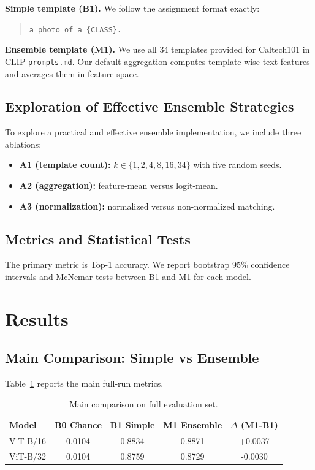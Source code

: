 \documentclass[11pt]{article}
\begin{document}
\textbf{Simple template (B1).}
We follow the assignment format exactly:
\begin{quote}
\texttt{a photo of a \{CLASS\}.}
\end{quote}

\textbf{Ensemble template (M1).}
We use all 34 templates provided for Caltech101 in CLIP \texttt{prompts.md}.
Our default aggregation computes template-wise text features and averages them in feature space.

\subsection{Exploration of Effective Ensemble Strategies}

To explore a practical and effective ensemble implementation, we include three ablations:
\begin{itemize}
  \item \textbf{A1 (template count):} $k \in \{1,2,4,8,16,34\}$ with five random seeds.
  \item \textbf{A2 (aggregation):} feature-mean versus logit-mean.
  \item \textbf{A3 (normalization):} normalized versus non-normalized matching.
\end{itemize}

\subsection{Metrics and Statistical Tests}

The primary metric is Top-1 accuracy.
We report bootstrap 95\% confidence intervals and McNemar tests between B1 and M1 for each model.

\section{Results}

\subsection{Main Comparison: Simple vs Ensemble}

Table~\ref{tab:main} reports the main full-run metrics.

\begin{table}[H]
\centering
\caption{Main comparison on full evaluation set.}
\label{tab:main}
\begin{tabular}{lcccc}
\toprule
Model & B0 Chance & B1 Simple & M1 Ensemble & $\Delta$ (M1-B1) \\
\midrule
ViT-B/16 & 0.0104 & 0.8834 & 0.8871 & +0.0037 \\
ViT-B/32 & 0.0104 & 0.8759 & 0.8729 & -0.0030 \\
\bottomrule
\end{tabular}
\end{table}
\end{document}
